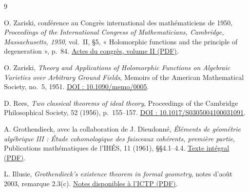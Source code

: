 \documentclass[11pt,a4paper]{article}
\begin{document}
\begin{thebibliography}{9}

O. Zariski,
conférence au Congrès international des mathématiciens de 1950,
\emph{Proceedings of the International Congress of Mathematicians,
Cambridge, Massachusetts, 1950}, vol.~II,
\S5, « Holomorphic functions and the principle of degeneration », p.~84.
\href{https://www.mathunion.org/fileadmin/ICM/Proceedings/ICM1950.2/ICM1950.2.ocr.pdf}
{Actes du congrès, volume II (PDF)}.

O. Zariski,
\emph{Theory and Applications of Holomorphic Functions on Algebraic
Varieties over Arbitrary Ground Fields},
Memoirs of the American Mathematical Society, no.~5, 1951.
\href{https://doi.org/10.1090/memo/0005}{DOI : 10.1090/memo/0005}.

D. Rees,
\emph{Two classical theorems of ideal theory},
Proceedings of the Cambridge Philosophical Society, 52 (1956),
p.~155--157.
\href{https://doi.org/10.1017/S0305004100031091}
{DOI : 10.1017/S0305004100031091}.

A. Grothendieck, avec la collaboration de J. Dieudonné,
\emph{Éléments de géométrie algébrique III : Étude cohomologique des
faisceaux cohérents, première partie},
Publications mathématiques de l'IHÉS, 11 (1961),
\S\S4.1--4.4.
\href{https://wstein.org/sga/circle/EGAIII.1.pdf}{Texte intégral (PDF)}.

L. Illusie,
\emph{Grothendieck's existence theorem in formal geometry},
notes d'août 2003, remarque 2.3(c).
\href{https://indico.ictp.it/event/a0255/session/28/contribution/17/material/0/0.pdf}
{Notes disponibles à l'ICTP (PDF)}.

\end{thebibliography}
\end{document}
